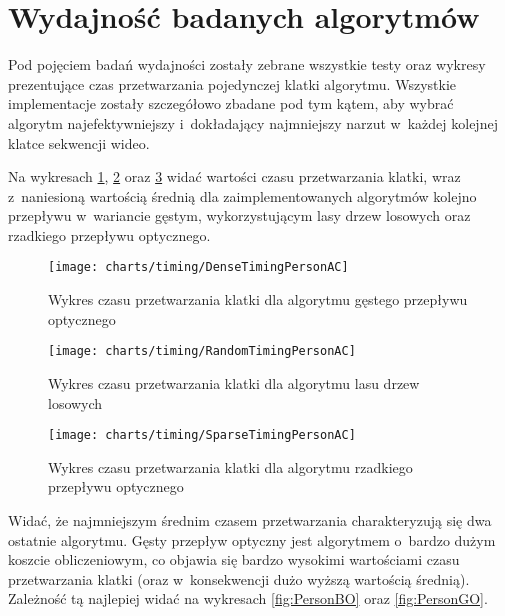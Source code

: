   \section{Wydajność badanych algorytmów}\label{Section_Timing}

    Pod pojęciem badań wydajności zostały zebrane wszystkie testy oraz wykresy prezentujące czas przetwarzania pojedynczej klatki algorytmu. Wszystkie implementacje zostały szczegółowo zbadane pod tym kątem, aby wybrać algorytm najefektywniejszy i~dokładający najmniejszy narzut w~każdej kolejnej klatce sekwencji wideo.

    Na wykresach \ref{fig:DenseTimingPersonAC}, \ref{fig:RandomTimingPersonAC} oraz \ref{fig:SparseTimingPersonAC} widać wartości czasu przetwarzania klatki, wraz z~naniesioną wartością średnią dla zaimplementowanych algorytmów kolejno przepływu w~wariancie gęstym, wykorzystującym lasy drzew losowych oraz rzadkiego przepływu optycznego.

      \begin{figure}[!ht]
        \centering
        \texttt{[image: charts/timing/DenseTimingPersonAC]}
        \caption[Wykres czasu przetwarzania klatki dla algorytmu gęstego przepływu optycznego]
                {Wykres czasu przetwarzania klatki dla algorytmu gęstego przepływu optycznego}
        \label{fig:DenseTimingPersonAC}
      \end{figure}

    \newpage
      \begin{figure}[!ht]
        \centering
        \texttt{[image: charts/timing/RandomTimingPersonAC]}
        \caption[Wykres czasu przetwarzania klatki dla algorytmu lasu drzew losowych]
                {Wykres czasu przetwarzania klatki dla algorytmu lasu drzew losowych}
        \label{fig:RandomTimingPersonAC}
      \end{figure}

      \begin{figure}[!ht]
        \centering
        \texttt{[image: charts/timing/SparseTimingPersonAC]}
        \caption[Wykres czasu przetwarzania klatki dla algorytmu rzadkiego przepływu optycznego]
                {Wykres czasu przetwarzania klatki dla algorytmu rzadkiego przepływu optycznego}
        \label{fig:SparseTimingPersonAC}
      \end{figure}

    Widać, że najmniejszym średnim czasem przetwarzania charakteryzują się dwa ostatnie algorytmu. Gęsty przepływ optyczny jest algorytmem o~bardzo dużym koszcie obliczeniowym, co objawia się bardzo wysokimi wartościami czasu przetwarzania klatki (oraz w~konsekwencji dużo wyższą wartością średnią). Zależność tą najlepiej widać na wykresach \ref{fig:PersonBO} oraz \ref{fig:PersonGO}.

